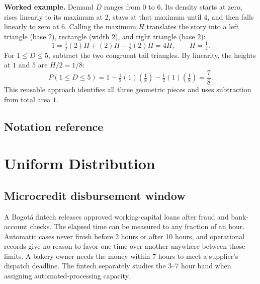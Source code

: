 \textbf{Worked example.} Demand $D$ ranges from $0$ to $6$.  Its density starts
at zero, rises linearly to its maximum at $2$, stays at that maximum until
$4$, and then falls linearly to zero at $6$.  Calling the maximum $H$
translates the story into a left triangle
(base $2$), rectangle (width $2$), and right triangle (base $2$):
\[
 1=\tfrac12(2)H+(2)H+\tfrac12(2)H=4H,
 \qquad H=\tfrac14.
\]
For $1\le D\le5$, subtract the two congruent tail triangles.  By linearity,
the heights at $1$ and $5$ are $H/2=1/8$:
\[
 P(1\le D\le5)=1-\tfrac12(1)(\tfrac18)-\tfrac12(1)(\tfrac18)=\frac78.
\]
This reusable approach identifies all three geometric pieces and uses
subtraction from total area $1$.


\subsection*{Notation reference}
\label{tone:C2:reference}
\section{Uniform Distribution}\label{sec:c2-uniform-practice}

\subsection{Microcredit disbursement window}\label{sec:c2-uniform-service}
A Bogotá fintech releases approved working-capital loans after fraud and
bank-account checks.  The elapsed time can be measured to any fraction of an
hour.  Automatic cases never finish before 2 hours or after 10 hours, and
operational records give no reason to favor one time over another anywhere
between those limits.  A bakery owner needs the money within 7 hours to meet a
supplier's dispatch deadline.  The fintech separately studies the 3--7 hour
band when assigning automated-processing capacity.

\begingroup{}
\endgroup

